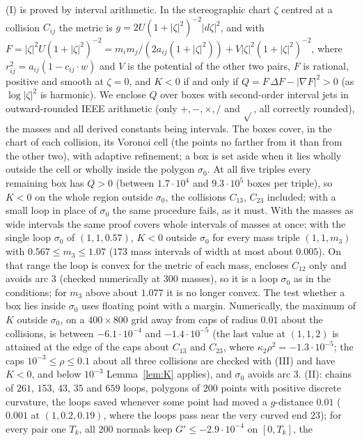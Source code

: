 \documentclass[11pt]{article}
\theoremstyle{definition}
\begin{document}
(I) is proved by interval arithmetic. In the stereographic chart $\zeta$ centred at a collision $C_{ij}$ the metric is
$g=2U(1+|\zeta|^2)^{-2}|d\zeta|^2$, and with
$F=|\zeta|^2U(1+|\zeta|^2)^{-2}=m_im_j/(2a_{ij}(1+|\zeta|^2))+V|\zeta|^2(1+|\zeta|^2)^{-2}$, where
$r_{ij}^2=a_{ij}(1-c_{ij}\cdot w)$ and $V$ is the potential of the other two pairs, $F$ is rational, positive and smooth
at $\zeta=0$, and $K<0$ if and only if $Q=F\,\Delta F-|\nabla F|^2>0$ (as $\log|\zeta|^2$ is harmonic). We enclose $Q$
over boxes with second-order interval jets in outward-rounded IEEE arithmetic (only $+,-,\times,/$ and $\sqrt{}$, all
correctly rounded), the masses and all derived constants being intervals. The boxes cover, in the chart of each
collision, its Voronoi cell (the points no farther from it than from the other two), with adaptive refinement; a box is
set aside when it lies wholly outside the cell or wholly inside the polygon $\sigma_0$. At all five triples every
remaining box has $Q>0$ (between $1.7\cdot10^4$ and $9.3\cdot10^5$ boxes per triple), so $K<0$ on the whole region
outside $\sigma_0$, the collisions $C_{13}$, $C_{23}$ included; with a small loop in place of $\sigma_0$ the same
procedure fails, as it must. With the masses as wide intervals the same proof covers whole intervals of masses at
once: with the single loop $\sigma_0$ of $(1,1,0.57)$, $K<0$ outside $\sigma_0$ for every mass triple $(1,1,m_3)$ with
$0.567\le m_3\le1.07$ ($173$ mass intervals of width at most about $0.005$). On that range the loop is convex for the
metric of each mass, encloses $C_{12}$ only and avoids arc $3$ (checked numerically at $300$ masses), so it is a
loop $\sigma_0$ as in the conditions; for $m_3$ above about $1.077$ it is no longer convex. The test whether a box lies
inside $\sigma_0$ uses floating point with a margin. Numerically, the maximum of $K$ outside
$\sigma_0$, on a
$400\times800$ grid away from caps of radius $0.01$ about the collisions, is between $-6.1\cdot10^{-4}$ and
$-1.4\cdot10^{-5}$ (the last value at $(1,1,2)$ is attained at the edge of the caps about $C_{13}$ and $C_{23}$,
where $\kappa_2\rho^2=-1.3\cdot10^{-5}$; the caps $10^{-3}\le\rho\le0.1$ about all three collisions are checked
with (III) and have $K<0$, and below $10^{-3}$ Lemma~\ref{lem:K} applies), and $\sigma_0$ avoids arc $3$. (II): chains
of $261$, $153$, $43$, $35$ and $659$ loops, polygons of $200$ points with positive discrete curvature, the loops
saved whenever some point had moved a $g$-distance $0.01$ ($0.001$ at $(1,0.2,0.19)$, where the loops pass near the
very curved end $23$); for every pair one $T_k$, all $200$ normals keep $G'\le-2.9\cdot10^{-4}$ on $[0,T_k]$, the
\end{document}
